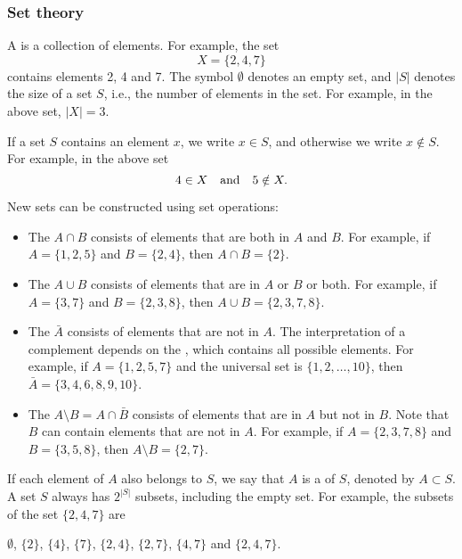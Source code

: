 \subsubsection{Set theory}


A  is a collection of elements.
For example, the set
\[X=\{2,4,7\}\]
contains elements 2, 4 and 7.
The symbol $\emptyset$ denotes an empty set,
and $|S|$ denotes the size of a set $S$,
i.e., the number of elements in the set.
For example, in the above set, $|X|=3$.

If a set $S$ contains an element $x$,
we write $x \in S$,
and otherwise we write $x \notin S$.
For example, in the above set
\[4 \in X \hspace{10px}\textrm{and}\hspace{10px} 5 \notin X.\]

\begin{samepage}
New sets can be constructed using set operations:
\begin{itemize}
\item The  $A \cap B$ consists of elements
that are both in $A$ and $B$.
For example, if $A=\{1,2,5\}$ and $B=\{2,4\}$,
then $A \cap B = \{2\}$.
\item The  $A \cup B$ consists of elements
that are in $A$ or $B$ or both.
For example, if $A=\{3,7\}$ and $B=\{2,3,8\}$,
then $A \cup B = \{2,3,7,8\}$.
\item The  $\bar A$ consists of elements
that are not in $A$.
The interpretation of a complement depends on
the , which contains all possible elements.
For example, if $A=\{1,2,5,7\}$ and the universal set is
$\{1,2,\ldots,10\}$, then $\bar A = \{3,4,6,8,9,10\}$.
\item The  $A \setminus B = A \cap \bar B$
consists of elements that are in $A$ but not in $B$.
Note that $B$ can contain elements that are not in $A$.
For example, if $A=\{2,3,7,8\}$ and $B=\{3,5,8\}$,
then $A \setminus B = \{2,7\}$.
\end{itemize}
\end{samepage}

If each element of $A$ also belongs to $S$,
we say that $A$ is a  of $S$,
denoted by $A \subset S$.
A set $S$ always has $2^{|S|}$ subsets,
including the empty set.
For example, the subsets of the set $\{2,4,7\}$ are
\begin{center}
$\emptyset$,
$\{2\}$, $\{4\}$, $\{7\}$, $\{2,4\}$, $\{2,7\}$, $\{4,7\}$ and $\{2,4,7\}$.
\end{center}

